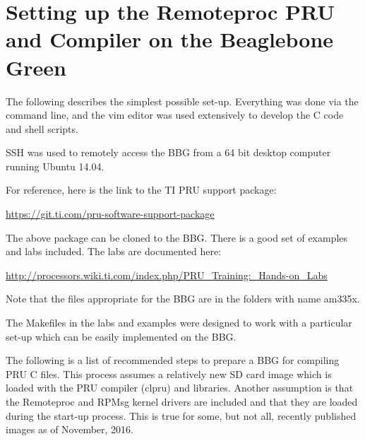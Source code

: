 %
%
%

\chapter{Setting up the Remoteproc PRU and Compiler on the Beaglebone Green}

The following describes the simplest possible set-up.  Everything was done via the command line, and the vim editor was used extensively to develop the C code and shell scripts.

SSH was used to remotely access the BBG from a 64 bit desktop computer running Ubuntu 14.04.

For reference, here is the link to the TI PRU support package:

\url{https://git.ti.com/pru-software-support-package}

The above package can be cloned to the BBG.  There is a good set of examples and labs included.  The labs are documented here:

\url{http://processors.wiki.ti.com/index.php/PRU_Training:_Hands-on_Labs}

Note that the files appropriate for the BBG are in the folders with name am335x.

The Makefiles in the labs and examples were designed to work with a particular set-up which can be easily implemented on the BBG.

The following is a list of recommended steps to prepare a BBG for compiling PRU C files.
This process assumes a relatively new SD card image which is loaded with the PRU compiler (clpru) and libraries.  Another assumption is that the Remoteproc and RPMsg kernel drivers are included and that they are loaded during the start-up process.  This is true for some, but not all, recently published images as of November, 2016.

